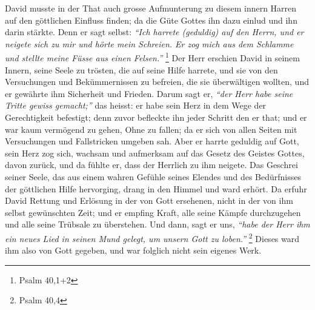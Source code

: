 David  musste in der That auch grosse Aufmunterung zu
diesem innern Harren
auf den göttlichen Einfluss finden; da die Güte Gottes ihn dazu einlud und ihn
darin stärkte. Denn er sagt selbst:
\textit{"`Ich harrete (geduldig) auf den Herrn, und
er neigete sich zu mir und hörte mein Schreien. Er zog mich aus dem Schlamme und
stellte meine Füsse aus einen Felsen."'}
\footnote{Psalm 40,1+2}
Der Herr
erschien David in seinem Innern, seine Seele zu trösten, die auf
seine Hilfe
harrete, und sie von den Versuchungen und Bekümmernissen zu befreien, die sie
überwältigen wollten, und er gewährte ihm Sicherheit und Frieden. Darum sagt er,
\textit{"`der Herr habe seine Tritte gewiss gemacht;"'}
das heisst: er habe sein Herz in
dem Wege der Gerechtigkeit befestigt; denn zuvor befleckte ihn jeder Schritt den
er that; und er war kaum vermögend zu gehen, Ohne zu fallen; da er sich von
allen Seiten mit Versuchungen und Fallstricken umgeben sah. Aber er harrte
geduldig auf Gott, sein Herz zog sich, wachsam und aufmerksam auf das Gesetz des
Geistes Gottes, davon zurück, und da fühlte er, dass der Herrlich zu ihm
neigete. Das Geschrei seiner Seele, das aus einem
wahren Gefühle seines Elendes
und des Bedürfnisses der göttlichen Hilfe hervorging, drang in den Himmel und
ward erhört. Da erfuhr David Rettung und Erlösung in der von Gott ersehenen,
nicht in der von ihm selbst gewünschten Zeit; und er empfing Kraft, alle seine
Kämpfe durchzugehen und alle seine Trübsale zu überstehen. Und dann, sagt er
uns,
\textit{"`habe der Herr ihm ein neues Lied in seinen Mund gelegt, um unsern Gott
zu
loben."'}
\footnote{Psalm 40,4}
Dieses ward ihm also von Gott gegeben, und war
folglich nicht sein eigenes Werk.

\medskip


